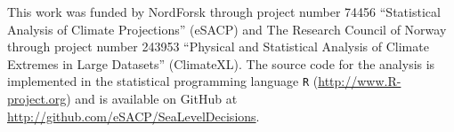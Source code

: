 \documentclass[draft,linenumbers]{agujournal}
\begin{document}
\begin{acknowledgments}
This work was funded by NordForsk through project number 74456 ``Statistical Analysis of Climate Projections'' (eSACP) and The Research Council of Norway through project number 243953 ``Physical and Statistical Analysis of Climate Extremes in Large Datasets'' (ClimateXL). The source code for the analysis is implemented in the statistical programming language {\tt R} (\url{http://www.R-project.org}) and is available on GitHub at \url{http://github.com/eSACP/SeaLevelDecisions}.
\end{acknowledgments}








\end{document}
